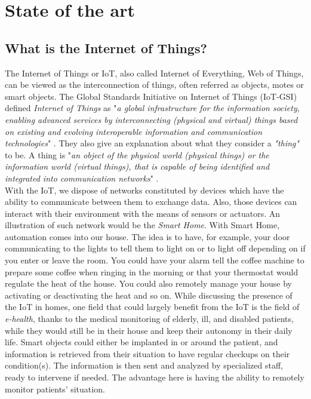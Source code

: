 \part{State of the art} \label{part:state_art}

\chapter{What is the Internet of Things?}

The Internet of Things or IoT, also called Internet of Everything, Web of Things, can be viewed as the interconnection of things, often referred as objects, motes or smart objects. The Global Standards Initiative on Internet of Things (IoT-GSI) defined \textit{Internet of Things} as "\textit{a global infrastructure for the information society, enabling advanced services by interconnecting (physical and virtual) things based on existing and evolving interoperable information and communication technologies}" \cite{ituitu}. They also give an explanation about what they consider a \textit{"thing"} to be. A thing is "\textit{an object of the physical world (physical things) or the information world (virtual things), that is capable of being identified and integrated into communication networks}" \cite{ituitu}.\\

With the IoT, we dispose of networks constituted by devices which have the ability to communicate between them to exchange data. Also, those devices can interact with their environment with the means of sensors or actuators. An illustration of such network would be the \textit{Smart Home}. With Smart Home, automation comes into our house. The idea is to have, for example, your door communicating to the lights to tell them to light on or to light off depending on if you enter or leave the room. You could have your alarm tell the coffee machine to prepare some coffee when ringing in the morning or that your thermostat would regulate the heat of the house. You could also remotely manage your house by activating or deactivating the heat and so on. While discussing the presence of the IoT in homes, one field that could largely benefit from the IoT is the field of \textit{e-health}, thanks to the medical monitoring of elderly, ill, and disabled patients, while they would still be in their house and keep their autonomy in their daily life. Smart objects could either be implanted in or around the patient, and information is retrieved from their situation to have regular checkups on their condition(s). The information is then sent and analyzed by specialized staff, ready to intervene if needed. The advantage here is having the ability to remotely monitor patients' situation.\\

